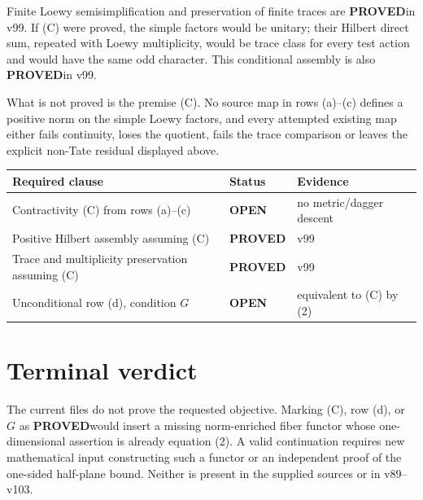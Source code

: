 \documentclass[11pt]{article}
\newcommand{\PROVED}{\textcolor{green!40!black}{\textbf{PROVED}}}
\newcommand{\OPEN}{\textcolor{red!70!black}{\textbf{OPEN}}}
\begin{document}
Finite Loewy semisimplification and preservation of finite traces are
\PROVED in v99.  If (C) were proved, the simple factors would be unitary;
their Hilbert direct sum, repeated with Loewy multiplicity, would be trace
class for every test action and would have the same odd character.  This
conditional assembly is also \PROVED in v99.

What is not proved is the premise (C).  No source map in rows (a)--(c)
defines a positive norm on the simple Loewy factors, and every attempted
existing map either fails continuity, loses the quotient, fails the trace
comparison or leaves the explicit non-Tate residual displayed above.

\begin{center}
\begin{tabular}{>{\raggedright\arraybackslash}p{.54\linewidth}
                >{\centering\arraybackslash}p{.16\linewidth}
                >{\raggedright\arraybackslash}p{.20\linewidth}}
\toprule
Required clause & Status & Evidence \\
\midrule
Contractivity (C) from rows (a)--(c) & \OPEN & no metric/dagger descent \\
Positive Hilbert assembly assuming (C) & \PROVED & v99 \\
Trace and multiplicity preservation assuming (C) & \PROVED & v99 \\
Unconditional row (d), condition $G$ & \OPEN & equivalent to (C) by (2) \\
\bottomrule
\end{tabular}
\end{center}

\section{Terminal verdict}

The current files do not prove the requested objective.  Marking (C), row
(d), or $G$ as \PROVED would insert a missing norm-enriched fiber functor
whose one-dimensional assertion is already equation (2).  A valid
continuation requires new mathematical input constructing such a functor
or an independent proof of the one-sided half-plane bound.  Neither is
present in the supplied sources or in v89--v103.
\end{document}
